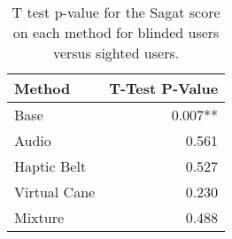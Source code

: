 
\begin{table}[!htb]
\centering
\caption{T test p-value for the Sagat score on each method for blinded users versus sighted users.}
\label{tab:ttest_sagat_score}
\begin{tabular}{lr}
\toprule
      Method & T-Test P-Value \\
\midrule
        Base &        0.007** \\
       Audio &          0.561 \\
 Haptic Belt &          0.527 \\
Virtual Cane &          0.230 \\
     Mixture &          0.488 \\
\bottomrule
\end{tabular}
\end{table}

